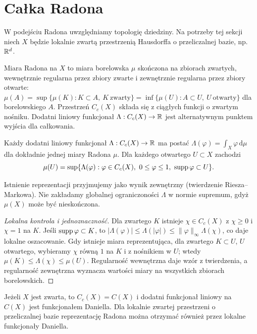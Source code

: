 \section{Całka Radona}
W podejściu Radona uwzględniamy topologię dziedziny. Na potrzeby tej sekcji niech $X$ będzie lokalnie zwartą przestrzenią Hausdorffa o przeliczalnej bazie, np. $\mathbb R^d$.
\begin{definicja}
Miara Radona na $X$ to miara borelowska $\mu$ skończona na zbiorach zwartych, wewnętrznie regularna przez zbiory zwarte i zewnętrznie regularna przez zbiory otwarte:
$\mu(A)=\sup\{\mu(K):K\subset A,\ K\ \text{zwarty}\}=\inf\{\mu(U):A\subset U,\ U\ \text{otwarty}\}$ dla borelowskiego $A$. Przestrzeń $C_c(X)$ składa się z ciągłych funkcji o zwartym nośniku. Dodatni liniowy funkcjonał $\Lambda:C_c(X)\to\mathbb R$ jest alternatywnym punktem wyjścia dla całkowania.
\end{definicja}
\begin{twierdzenie}
Każdy dodatni liniowy funkcjonał $\Lambda:C_c(X)\to\mathbb R$ ma postać $\Lambda(\varphi)=\int_X\varphi\,\mathrm d\mu$ dla dokładnie jednej miary Radona $\mu$. Dla każdego otwartego $U\subset X$ zachodzi
\[
\mu(U)=\sup\{\Lambda(\varphi):\varphi\in C_c(X),\ 0\le\varphi\le1,\ \supp\varphi\subset U\}.
\]
\end{twierdzenie}
Istnienie reprezentacji przyjmujemy jako wynik zewnętrzny (twierdzenie Riesza--Markowa). Nie zakładamy globalnej ograniczoności $\Lambda$ w normie supremum, gdyż $\mu(X)$ może być nieskończona.
\begin{proof}[Lokalna kontrola i jednoznaczność]
Dla zwartego $K$ istnieje $\chi\in C_c(X)$ z $\chi\ge0$ i $\chi=1$ na $K$. Jeśli $\operatorname{supp}\varphi\subset K$, to $|\Lambda(\varphi)|\le\Lambda(|\varphi|)\le\|\varphi\|_\infty\Lambda(\chi)$, co daje lokalne oszacowanie. Gdy istnieje miara reprezentująca, dla zwartego $K\subset U$, $U$ otwartego, wybieramy $\chi$ równą $1$ na $K$ i z nośnikiem w $U$; wtedy $\mu(K)\le\Lambda(\chi)\le\mu(U)$. Regularność wewnętrzna daje wzór z twierdzenia, a regularność zewnętrzna wyznacza wartości miary na wszystkich zbiorach borelowskich.
\end{proof}
\begin{stwierdzenie}
Jeżeli $X$ jest zwarta, to $C_c(X)=C(X)$ i dodatni funkcjonał liniowy na $C(X)$ jest funkcjonałem Daniella. Dla lokalnie zwartej przestrzeni o przeliczalnej bazie reprezentację Radona można otrzymać również przez lokalne funkcjonały Daniella.
\end{stwierdzenie}
